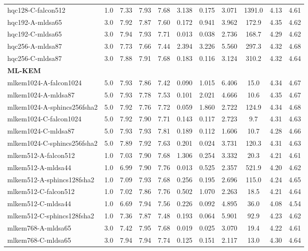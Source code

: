 \begin{table}[htbp]
\begin{tabular}{@{}llccccccccc@{}}
hqc128-C-falcon512 & 1.0 & 7.33 & 7.93 & 7.68 & 3.138 & 0.175 & 3.071 & 1391.0 & 4.13 & 4.61 \\
hqc192-A-mldsa65 & 3.0 & 7.92 & 7.87 & 7.60 & 0.172 & 0.941 & 3.962 & 172.9 & 4.35 & 4.62 \\
hqc192-C-mldsa65 & 3.0 & 7.94 & 7.93 & 7.71 & 0.013 & 0.038 & 2.736 & 168.7 & 4.29 & 4.62 \\
hqc256-A-mldsa87 & 3.0 & 7.73 & 7.66 & 7.44 & 2.394 & 3.226 & 5.560 & 297.3 & 4.32 & 4.68 \\
hqc256-C-mldsa87 & 3.0 & 7.88 & 7.91 & 7.68 & 0.183 & 0.116 & 3.124 & 310.2 & 4.32 & 4.64 \\
\midrule
\multicolumn{11}{l}{\textbf{ML-KEM}}\\
mlkem1024-A-falcon1024 & 5.0 & 7.93 & 7.86 & 7.42 & 0.090 & 1.015 & 6.406 & 15.0 & 4.34 & 4.67 \\
mlkem1024-A-mldsa87 & 5.0 & 7.93 & 7.78 & 7.53 & 0.101 & 2.021 & 4.666 & 10.6 & 4.35 & 4.67 \\
mlkem1024-A-sphincs256fsha2 & 5.0 & 7.92 & 7.76 & 7.72 & 0.059 & 1.860 & 2.722 & 124.9 & 4.34 & 4.68 \\
mlkem1024-C-falcon1024 & 5.0 & 7.92 & 7.90 & 7.71 & 0.143 & 0.117 & 2.723 & 9.7 & 4.31 & 4.63 \\
mlkem1024-C-mldsa87 & 5.0 & 7.93 & 7.93 & 7.81 & 0.189 & 0.112 & 1.606 & 10.7 & 4.28 & 4.66 \\
mlkem1024-C-sphincs256fsha2 & 5.0 & 7.89 & 7.92 & 7.63 & 0.201 & 0.024 & 3.731 & 120.3 & 4.31 & 4.63 \\
mlkem512-A-falcon512 & 1.0 & 7.03 & 7.90 & 7.68 & 1.306 & 0.254 & 3.332 & 20.3 & 4.21 & 4.61 \\
mlkem512-A-mldsa44 & 1.0 & 6.99 & 7.90 & 7.76 & 0.013 & 0.525 & 2.357 & 521.9 & 4.20 & 4.62 \\
mlkem512-A-sphincs128fsha2 & 1.0 & 7.09 & 7.93 & 7.68 & 0.256 & 0.195 & 2.696 & 115.0 & 4.24 & 4.65 \\
mlkem512-C-falcon512 & 1.0 & 7.02 & 7.86 & 7.76 & 0.502 & 1.070 & 2.263 & 18.5 & 4.21 & 4.64 \\
mlkem512-C-mldsa44 & 1.0 & 6.69 & 7.94 & 7.56 & 0.226 & 0.092 & 4.895 & 36.0 & 4.08 & 4.54 \\
mlkem512-C-sphincs128fsha2 & 1.0 & 7.36 & 7.87 & 7.48 & 0.193 & 0.064 & 5.901 & 92.9 & 4.23 & 4.62 \\
mlkem768-A-mldsa65 & 3.0 & 7.42 & 7.95 & 7.68 & 0.019 & 0.025 & 3.070 & 19.4 & 4.22 & 4.61 \\
mlkem768-C-mldsa65 & 3.0 & 7.94 & 7.94 & 7.74 & 0.125 & 0.151 & 2.117 & 13.0 & 4.30 & 4.64 \\
\bottomrule
\end{tabular}
\end{table}
